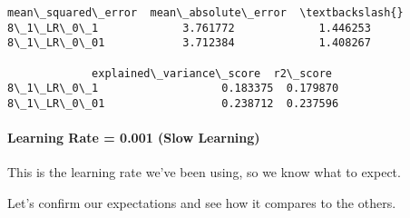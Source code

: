 \documentclass[11pt]{article}
\makeatletter
\newcommand{\boxspacing}{\kern\kvtcb@left@rule\kern\kvtcb@boxsep}
\newcommand{\prompt}[4]{
        {\ttfamily\llap{{\color{#2}[#3]:\hspace{3pt}#4}}\vspace{-\baselineskip}}
    }
\makeatother
\begin{document}
            \begin{tcolorbox}[breakable, size=fbox, boxrule=.5pt, pad at break*=1mm, opacityfill=0]
\prompt{Out}{outcolor}{80}{\boxspacing}
\begin{Verbatim}[commandchars=\\\{\}]
             mean\_squared\_error  mean\_absolute\_error  \textbackslash{}
8\_1\_LR\_0\_1             3.761772             1.446253
8\_1\_LR\_0\_01            3.712384             1.408267

             explained\_variance\_score  r2\_score
8\_1\_LR\_0\_1                   0.183375  0.179870
8\_1\_LR\_0\_01                  0.238712  0.237596
\end{Verbatim}
\end{tcolorbox}
        
    \paragraph{Learning Rate = 0.001 (Slow
Learning)}\label{learning-rate-0.001-slow-learning}

This is the learning rate we've been using, so we know what to expect.

Let's confirm our expectations and see how it compares to the others.
\end{document}
